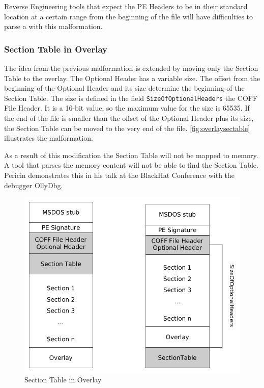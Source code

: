 Reverse Engineering tools that expect the PE Headers to be in their standard location at a certain range from the beginning of the file will have difficulties to parse a \PE{} with this malformation.

\subsubsection*{Section Table in Overlay}

The idea from the previous malformation is extended by moving only the Section Table to the overlay. The Optional Header has a variable size. The offset from the beginning of the Optional Header and its size determine the beginning of the Section Table. The size is defined in the field \texttt{SizeOfOptionalHeaders} the COFF File Header. It is a 16-bit value, so the maximum value for the size is 65535. If the end of the file is smaller than the offset of the Optional Header plus its size, the Section Table can be moved to the very end of the file. \autoref{fig:overlaysectable} illustrates the malformation.

As a result of this modification the Section Table will not be mapped to memory. A tool that parses the memory content will not be able to find the Section Table. Pericin demonstrates this in his talk at the BlackHat Conference with the debugger OllyDbg. \cite[min.\thinspace{}14:45]{vuksan11} 

\begin{figure}
\includegraphics[width=.98\textwidth, height=.60\textheight,keepaspectratio]{graphics/overlaysectable}
\caption{Section Table in Overlay }
\label{fig:overlaysectable} 
\end{figure}

